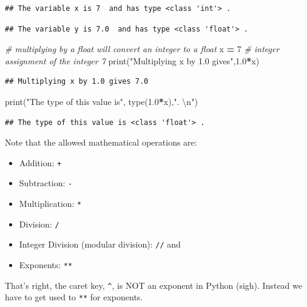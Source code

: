 \documentclass[
]{book}
\newenvironment{Shaded}{\begin{snugshade}}{\end{snugshade}}
\newcommand{\BuiltInTok}[1]{#1}
\newcommand{\CharTok}[1]{\textcolor[rgb]{0.31,0.60,0.02}{#1}}
\newcommand{\CommentTok}[1]{\textcolor[rgb]{0.56,0.35,0.01}{\textit{#1}}}
\newcommand{\DecValTok}[1]{\textcolor[rgb]{0.00,0.00,0.81}{#1}}
\newcommand{\FloatTok}[1]{\textcolor[rgb]{0.00,0.00,0.81}{#1}}
\newcommand{\NormalTok}[1]{#1}
\newcommand{\OperatorTok}[1]{\textcolor[rgb]{0.81,0.36,0.00}{\textbf{#1}}}
\newcommand{\StringTok}[1]{\textcolor[rgb]{0.31,0.60,0.02}{#1}}
\providecommand{\tightlist}{%
  \setlength{\itemsep}{0pt}\setlength{\parskip}{0pt}}
\theoremstyle{definition}
\theoremstyle{definition}
\theoremstyle{definition}
\theoremstyle{remark}
\begin{document}
\begin{verbatim}
## The variable x is 7  and has type <class 'int'> .
\end{verbatim}

\begin{verbatim}
## The variable y is 7.0  and has type <class 'float'> .
\end{verbatim}

\begin{Shaded}
\begin{Highlighting}[]
\CommentTok{\# multiplying by a float will convert an integer to a float}
\NormalTok{x }\OperatorTok{=} \DecValTok{7} \CommentTok{\# integer assignment of the integer 7}
\BuiltInTok{print}\NormalTok{(}\StringTok{"Multiplying x by 1.0 gives"}\NormalTok{,}\FloatTok{1.0}\OperatorTok{*}\NormalTok{x)}
\end{Highlighting}
\end{Shaded}

\begin{verbatim}
## Multiplying x by 1.0 gives 7.0
\end{verbatim}

\begin{Shaded}
\begin{Highlighting}[]
\BuiltInTok{print}\NormalTok{(}\StringTok{"The type of this value is"}\NormalTok{, }\BuiltInTok{type}\NormalTok{(}\FloatTok{1.0}\OperatorTok{*}\NormalTok{x),}\StringTok{". }\CharTok{\textbackslash{}n}\StringTok{"}\NormalTok{)}
\end{Highlighting}
\end{Shaded}

\begin{verbatim}
## The type of this value is <class 'float'> .
\end{verbatim}

Note that the allowed mathematical operations are:

\begin{itemize}
\tightlist
\item
  Addition: \texttt{+}
\item
  Subtraction: \texttt{-}
\item
  Multiplication: \texttt{*}
\item
  Division: \texttt{/}
\item
  Integer Division (modular division): \texttt{//} and
\item
  Exponents: \texttt{**}
\end{itemize}

That's right, the caret key, \texttt{\^{}}, is NOT an exponent in Python (sigh). Instead we have to get used to \texttt{**} for exponents.
\end{document}
